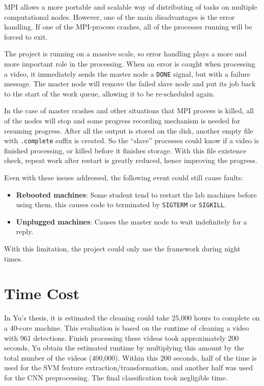 \documentclass[bsc,logo,twoside,fullspacing,parskip]{infthesis}
\begin{document}
MPI allows a more portable and scalable way of distributing of tasks on multiple computational nodes.
However, one of the main disadvantages is the error handling. 
If one of the MPI-process crashes, all of the processes running will be forced to exit.

The project is running on a massive scale, so error handling plays a more and more important role in the processing. 
When an error is caught when processing a video, it immediately sends the master node a {\tt DONE} signal, but with a failure message. The master node will remove the failed slave node and put its job back to the start of the work queue, allowing it to be re-scheduled again.

In the case of master crashes and other situations that MPI process is killed, all of the nodes will stop and some progress recording mechanism is needed for resuming progress. After all the output is stored on the disk, another empty file with {\tt .complete} suffix is created. So the ``slave'' processes could know if a video is finished processing, or killed before it finishes storage. With this file existence check, repeat work after restart is greatly reduced, hence improving the progress.

Even with these issues addressed, the following event could still cause faults:
\begin{itemize}
\setlength{\parskip}{0pt}
\item \textbf{Rebooted machines}: Some student tend to restart the lab machines before using them, this causes code to terminated by {\tt SIGTERM} or {\tt SIGKILL}.
\item \textbf{Unplugged machines}: Causes the master node to wait indefinitely for a reply.
\end{itemize}
With this limitation, the project could only use the framework during night times.

\section{Time Cost} 

In Yu's thesis\cite{Yu}, it is estimated the cleaning could take 25,000 hours to complete on a 40-core machine.
This evaluation is based on the runtime of cleaning a video with 961 detections.
Finish processing these videos took approximately 200 seconds, Yu obtain the estimated runtime by multiplying this amount by the total number of the videos (400,000).
Within this 200 seconds, half of the time is used for the SVM feature extraction/transformation, and another half was used for the CNN preprocessing. The final classification took negligible time.
\end{document}
